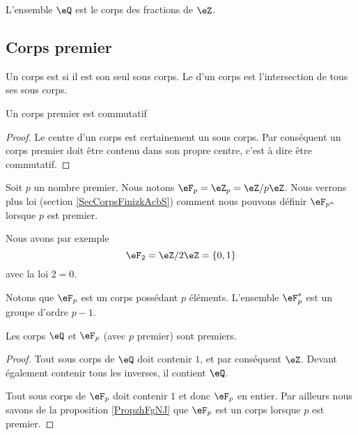 L'ensemble \( \eQ\) est le corps des fractions de \( \eZ\).

\subsection{Corps premier}
\label{subseccorpspremhBlYIv}

\begin{definition}
    Un corps est  si il est son seul sous corps. Le  d'un corps est l'intersection de tous ses sous corps.
\end{definition}

\begin{lemma}
    Un corps premier est commutatif
\end{lemma}

\begin{proof}
    Le centre d'un corps est certainement un sous corps. Par conséquent un corps premier doit être contenu dans son propre centre, c'est à dire être commutatif.
\end{proof}

Soit \( p\) un nombre premier. Nous notons \( \eF_p=\eZ_p=\eZ/p\eZ\). Nous verrons plus loi (section \ref{SecCorpsFinizkAcbS}) comment nous pouvons définir \( \eF_{p^n}\) lorsque \( p\) est premier.

Nous avons par exemple 
\begin{equation}
    \eF_2=\eZ/2\eZ=\{ 0,1 \}
\end{equation}
avec la loi \( 2=0\).

Notons que \( \eF_p\) est un corps possédant \( p\) éléments. L'ensemble \( \eF_p^*\) est un groupe d'ordre \( p-1\).

\begin{lemma}
    Les corps \( \eQ\) et \( \eF_p\) (avec \( p\) premier) sont premiers.
\end{lemma}

\begin{proof}
    Tout sous corps de \( \eQ\) doit contenir \( 1\), et par conséquent \( \eZ\). Devant également contenir tous les inverses, il contient \( \eQ\).

    Tout sous corps de \(\eF_p \) doit contenir \( 1\) et donc \( \eF_p\) en entier. Par ailleurs nous savons de la proposition \ref{PropzhFgNJ} que \( \eF_p\) est un corps lorsque \( p\) est premier.
\end{proof}

